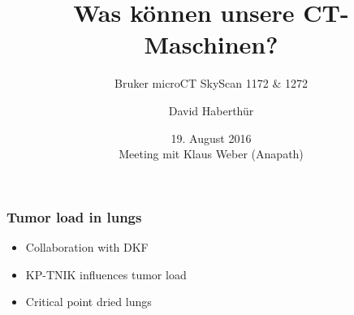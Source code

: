 \documentclass[18pt,caption=numbered]{beamer}
\subtitle{Bruker microCT SkyScan 1172 \& 1272}
\author{David Haberthür}
\institute{Institute of Anatomy\\Universität Bern}
\date{19. August 2016\\Meeting mit Klaus Weber (Anapath)}
\begin{document}
\title{Was können unsere \si{\micro}CT-Maschinen?} %

\begin{frame}
	\maketitle
\end{frame}

\begin{frame}
	\frametitle{Tumor load in lungs}
	\begin{itemize}
		\item Collaboration with DKF
		\item KP-TNIK influences tumor load
		\item Critical point dried lungs		
	\end{itemize}
\end{frame}
\end{document}
